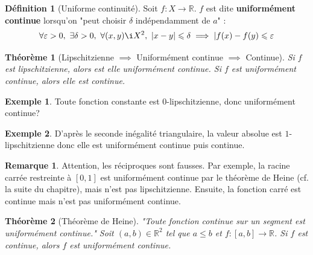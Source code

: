\documentclass[french]{book}
\newcommand{\R}{\mathbb{R}}
\theoremstyle{plain}
\newtheorem{thm}{Théorème}[chapter]
\theoremstyle{definition}
\newtheorem{dfn}{Définition}[chapter]
\newtheorem{exa}{Exemple}[chapter]
\newtheorem{rmq}{Remarque}[chapter]
\theoremstyle{remark}
\begin{document}
\begin{dfn}[Uniforme continuité]
	Soit $f:X\rightarrow\R$. $f$ est dite \textbf{uniformément continue} lorsqu'on "peut choisir $\delta$ indépendamment de $a$" : $$\forall\varepsilon>0,\ \exists\delta>0,\ \forall(x,y)\i X^2,\ \lvert x-y\rvert\leqslant\delta\implies\lvert f(x)-f(y)\leqslant\varepsilon$$
\end{dfn}
\begin{thm}[Lipschitzienne $\implies$ Uniformément continue $\implies$ Continue]
	Si $f$ est lipschitzienne, alors est elle uniformément continue. Si $f$ est uniformément continue, alors elle est continue.
\end{thm}
\begin{exa}
	Toute fonction constante est $0$-lipschitzienne, donc uniformément continue?
\end{exa}
\begin{exa}
	D'après le seconde inégalité triangulaire, la valeur absolue est $1$-lipschitzienne donc elle est uniformément continue puis continue.
\end{exa}
\begin{rmq}
	Attention, les réciproques sont fausses. Par exemple, la racine carrée restreinte à $[0,1]$ est uniformément continue par le théorème de Heine (cf. la suite du chapitre), mais n'est pas lipschitzienne. Ensuite, la fonction carré est continue mais n'est pas uniformément continue.
\end{rmq}
\begin{thm}[Théorème de Heine]
	"Toute fonction continue sur un segment est uniformément continue." Soit $(a,b)\in\R^2$ tel que $a\leqslant b$ et $f:[a,b]\rightarrow\R$. Si $f$ est continue, alors $f$ est uniformément continue.
\end{thm}
\end{document}
